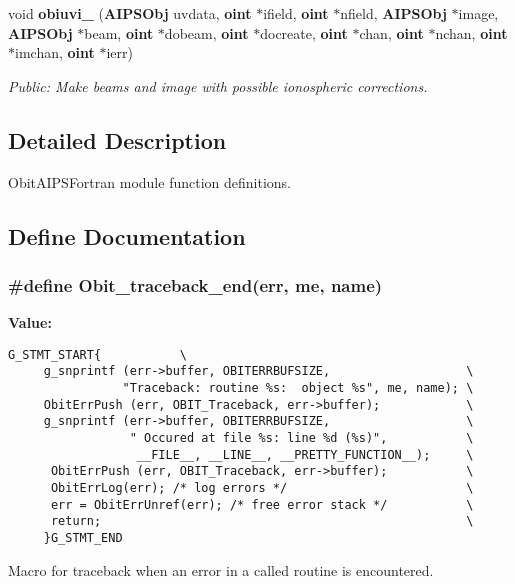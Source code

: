 \begin{CompactItemize}
void {\bf obiuvi\_\-} ({\bf AIPSObj} uvdata, {\bf oint} $\ast$ifield, {\bf oint} $\ast$nfield, {\bf AIPSObj} $\ast$image, {\bf AIPSObj} $\ast$beam, {\bf oint} $\ast$dobeam, {\bf oint} $\ast$docreate, {\bf oint} $\ast$chan, {\bf oint} $\ast$nchan, {\bf oint} $\ast$imchan, {\bf oint} $\ast$ierr)
\begin{CompactList}\small\item\em Public: Make beams and image with possible ionospheric corrections. \item\end{CompactList}\end{CompactItemize}


\subsection{Detailed Description}
Obit\-AIPSFortran module function definitions. 



\subsection{Define Documentation}
\subsubsection{\setlength{\rightskip}{0pt plus 5cm}\#define Obit\_\-traceback\_\-end(err, me, name)}\label{ObitAIPSFortran_8c_a0}


{\bf Value:}

\footnotesize\begin{verbatim}G_STMT_START{           \
     g_snprintf (err->buffer, OBITERRBUFSIZE,                   \
                "Traceback: routine %s:  object %s", me, name); \
     ObitErrPush (err, OBIT_Traceback, err->buffer);            \
     g_snprintf (err->buffer, OBITERRBUFSIZE,                   \
                 " Occured at file %s: line %d (%s)",           \
                  __FILE__, __LINE__, __PRETTY_FUNCTION__);     \
      ObitErrPush (err, OBIT_Traceback, err->buffer);           \
      ObitErrLog(err); /* log errors */                         \
      err = ObitErrUnref(err); /* free error stack */           \
      return;                                                   \
     }G_STMT_END
\end{verbatim}\normalsize 
Macro for traceback when an error in a called routine is encountered. 

